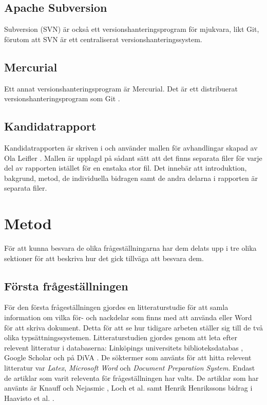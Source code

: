 \subsection{Apache Subversion}
Subversion (SVN) \cite{svn} är också ett versionshanteringsprogram för mjukvara, likt Git, förutom att SVN är ett centraliserat versionshanteringssystem.

\subsection{Mercurial}
Ett annat versionshanteringsprogram är Mercurial. Det är ett distribuerat versionshanteringsprogram som Git \cite{mercurial}.

\subsection{Kandidatrapport}
\label{sec:thesis-info-tuhkala}
Kandidatrapporten är skriven i \latex och använder mallen för avhandlingar skapad av Ola Leifler \cite{thesis_template}. Mallen är upplagd på sådant sätt att det finns separata filer för varje del av rapporten istället för en enstaka stor fil. Det innebär att introduktion, bakgrund, metod, de individuella bidragen samt de andra delarna i rapporten är separata filer.

\section{Metod}
\label{sec:method-tuhkala}
För att kunna besvara de olika frågeställningarna har dem delats upp i tre olika sektioner för att beskriva hur det gick tillväga att besvara dem.

\subsection{Första frågeställningen}
För den första frågeställningen gjordes en litteraturstudie för att samla information om vilka för- och nackdelar som finns med att använda \latex eller Word för att skriva dokument. Detta för att se hur tidigare arbeten ställer sig till de två olika typsättningssystemen. Litteraturstudien gjordes genom att leta efter relevent litteratur i databaserna: Linköpings universitets biblioteksdatabas \cite{liu_bibliotek}, Google Scholar \cite{google_scholar} och på DiVA \cite{diva_portal}. De söktermer som använts för att hitta relevent litteratur var \textit{Latex}, \textit{Microsoft Word} och \textit{Document Preparation System}. Endast de artiklar som varit releventa för frågeställningen har valts. De artiklar som har använts är Knauff och Nejasmic \cite{knauff2014efficiency}, Loch et al. \cite{loch2014master} samt Henrik Henrikssons bidrag i Haavisto et al. \cite{Haavisto954095}.


